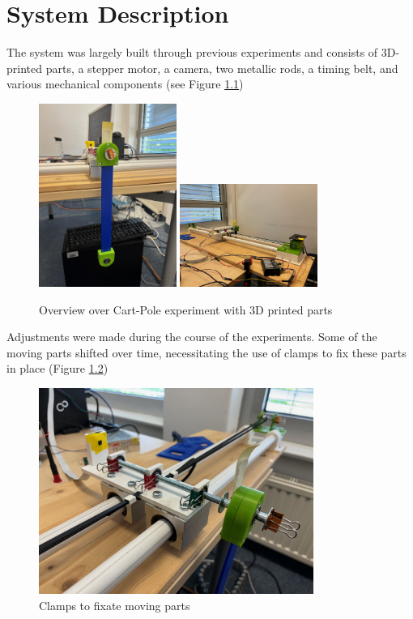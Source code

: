 \chapter{System Description}

The system was largely built through previous experiments and consists of 3D-printed parts, a stepper motor, a camera, two metallic rods, a timing belt, and various mechanical components (see Figure \ref{fig:overview_cart_pole_experiment})
\begin{figure}[htbp]
    \centering
    \includegraphics[width=0.4\textwidth]{img/front.jpg}
    \includegraphics[width=0.4\textwidth]{img/back.jpg}
    \caption{Overview over Cart-Pole experiment with 3D printed parts}
    \label{fig:overview_cart_pole_experiment}
\end{figure}
Adjustments were made during the course of the experiments. Some of the moving parts shifted over time, necessitating the use of clamps to fix these parts in place (Figure \ref{fig:clamps})
\begin{figure}[htbp]
    \centering
    \includegraphics[width=0.8\textwidth]{img/clamps.jpg}
    \caption{Clamps to fixate moving parts}
    \label{fig:clamps}
\end{figure}

